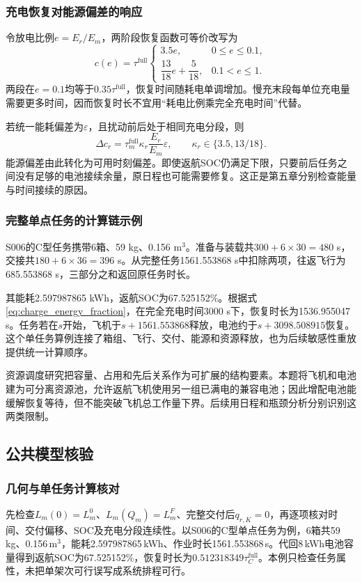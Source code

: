 \documentclass[withoutpreface,colorprint]{format}
\numberwithin{equation}{section}
\numberwithin{figure}{section}
\numberwithin{table}{section}
\begin{document}
\subsubsection{充电恢复对能源偏差的响应}
令放电比例$e=E_r/E_m$，两阶段恢复函数可等价改写为
\begin{equation}
 c(e)=\tau^{\mathrm{full}}
 \begin{cases}
 3.5e,&0\le e\le0.1,\\
 \dfrac{13}{18}e+\dfrac5{18},&0.1<e\le1.
 \end{cases}
\label{eq:charge_energy_fraction}
\end{equation}
两段在$e=0.1$均等于$0.35\tau^{\mathrm{full}}$，恢复时间随耗电单调增加。慢充末段每单位充电量需要更多时间，因而恢复时长不宜用“耗电比例乘完全充电时间”代替。

若统一能耗偏差为$\varepsilon$，且扰动前后处于相同充电分段，则
\begin{equation}
 \Delta c_r=\tau_m^{\mathrm{full}}\kappa_r\frac{E_r}{E_m}\varepsilon,
 \qquad \kappa_r\in\{3.5,13/18\}.
\label{eq:charge_local_perturbation}
\end{equation}
能源偏差由此转化为可用时刻偏差。即使返航SOC仍满足下限，只要前后任务之间没有足够的电池接续余量，原日程也可能需要修复。这正是第五章分别检查能量与时间接续的原因。

\subsubsection{完整单点任务的计算链示例}
S006的C型任务携带6箱、59 kg、0.156 m$^3$。准备与装载共$300+6\times30=480$ s，交接共$180+6\times36=396$ s。从完整任务1561.553868 s中扣除两项，往返飞行为685.553868 s，三部分之和返回原任务时长。

其能耗2.597987865 kWh，返航SOC为67.525152\%。根据式\eqref{eq:charge_energy_fraction}，在完全充电时间3000 s下，恢复时长为1536.955047 s。任务若在$s$开始，飞机于$s+1561.553868$释放，电池约于$s+3098.508915$恢复。这个单任务算例连接了箱组、飞行、交付、能源和资源释放，也为后续敏感性重放提供统一计算顺序。

资源调度研究把容量、占用和先后关系作为可扩展的结构要素\cite{hartmann2022}。本题将飞机和电池建为可分离资源池，允许返航飞机使用另一组已满电的兼容电池；因此增配电池能缓解恢复等待，但不能突破飞机总工作量下界。后续用日程和瓶颈分析分别识别这两类限制。


\subsection{公共模型核验}
\subsubsection{几何与单任务计算核对}
先检查$L_m(0)=L_m^0$、$L_m(Q_m)=L_m^F$、完整交付后$q_{r,K}=0$，再逐项核对时间、交付偏移、SOC及充电分段连续性。以S006的C型单点任务为例，6箱共59\,kg、0.156\,m$^3$，能耗2.597987865\,kWh、作业时长1561.553868\,s。代回8\,kWh电池容量得到返航SOC为67.525152\%，恢复时长为$0.512318349\tau_C^{\mathrm{full}}$。本例只检查任务属性，未把单架次可行误写成系统排程可行。
\end{document}
